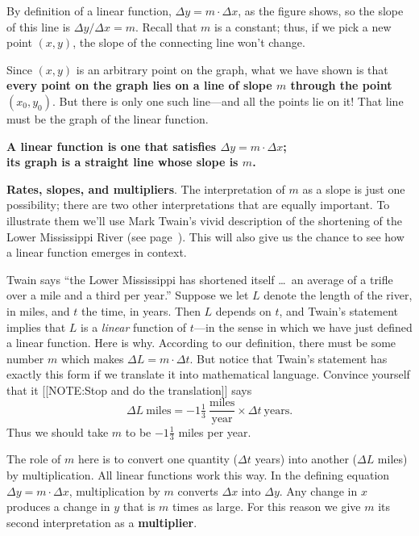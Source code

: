 By definition of a linear function, $\Delta y=m\cdot\Delta x$, as the
figure shows, so the slope of this line is $\Delta y/\Delta x = m$.
Recall that $m$ is a constant; thus, if we pick a new point $(x, y)$,
the slope of the connecting line won't change.

Since $(x, y)$ is an arbitrary point on the graph, what we have shown
is that {\bf every point on the graph lies on a line of slope
  \boldmath $m$ through the point \boldmath $(x_0, y_0)$}.  But there
is only one such line---and all the points lie on it!  That line must
be the graph of the linear function.


\begin{observation}
\bf A linear function is one that 
			satisfies \boldmath 
			$\Delta y = m\cdot\Delta x$;\\
\bf its graph is a straight line whose slope is
			\boldmath $m$.
\end{observation}




{\bf Rates, slopes, and
  multipliers}.\label{multiplier-begin}
The interpretation of $m$ as a slope is just one possibility; there
are two other interpretations that are equally important.  To
illustrate them we'll use Mark Twain's vivid description of the
shortening of the Lower Mississippi River (see
page~\pageref{`twain'}).  This will also give us the chance to see how
a linear function emerges in context.

\enlargethispage*{10pt}
Twain says ``the Lower Mississippi has shortened itself \ldots\ an
average of a trifle over a mile and a third per year.''  Suppose we
let $L$ denote the length of the river, in miles, and $t$ the time, in
years.  Then $L$ depends on $t$, and Twain's statement implies that
$L$ is a {\em linear\/} function of $t$---in the sense in which we
have just defined a linear function.  Here is why.  According to our
definition, there must be some number $m$ which makes $\Delta L =
m\cdot\Delta t$.  But notice that Twain's statement has exactly this
form if we translate it into mathematical language.  Convince yourself
that it 
[[NOTE:Stop and do  the translation]]
says 
\[
\Delta L \ \mbox{miles} = -1 \tfrac{1}{3} \ 
			\dfrac{\text{miles}}{\text{year}}
		\times \Delta t \ \mbox{years}.
\]
Thus we should take $m$ to be $-1\tfrac{1}{3}$ miles per year.  


The role of $m$ here is to convert one quantity ($\Delta t$ years)
into another ($\Delta L$ miles) by multiplication.  All linear
functions work this way.  In the defining equation $\Delta y =
m\cdot\Delta x$, multiplication by $m$ converts $\Delta x$ into
$\Delta y$.  Any change in $x$ produces a change in $y$ that is $m$
times as large.  For this reason we give $m$ its second interpretation
as a {\bf multiplier}.

